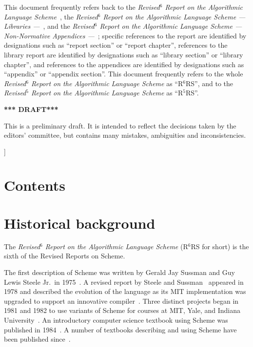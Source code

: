 \documentclass[twoside,twocolumn]{algol60}
\newcommand{\rn}[1]{R$^{#1}$RS}
\begin{document}
{This document frequently refers back to the \textit{Revised$^6$ Report
  on the Algorithmic Language Scheme}~\cite{R6RS}, the
\textit{Revised$^6$ Report on the Algorithmic Language Scheme ---
  Libraries ---}~\cite{R6RS-libraries}, and the \textit{Revised$^6$
  Report on the Algorithmic Language Scheme --- Non-Normative
  Appendices ---}~\cite{R6RS-appendices}; specific references to the
report are identified by designations such as ``report section'' or
``report chapter'', references to the library report are identified by
designations such as ``library section'' or ``library chapter'', and
references to the appendices are identified by designations such as
``appendix'' or ``appendix section''.  This document frequently refers
to the whole \textit{Revised$^6$ Report on the Algorithmic Language
  Scheme} as ``\rn{6}'', and to the \textit{Revised$^5$ Report
  on the Algorithmic Language Scheme} as ``\rn{5}''.

\bigskip

\begin{center}
{\large \bf
*** DRAFT*** \\
}\end{center}

This is a preliminary draft.  It is intended to reflect the decisions
taken by the editors' committee, but contains many mistakes,
ambiguities and inconsistencies.

}]

\texonly\clearpage\endtexonly

\chapter*{Contents}
\addvspace{3.5pt}                  %
\renewcommand{\tocshrink}{-4.0pt}  %
{%
\tableofcontents
}

\vfill

\texonly\clearpage\endtexonly


\chapter{Historical background}

The \textit{Revised$^6$ Report on the Algorithmic Language Scheme}
(\rn{6} for short) is the sixth of the Revised Reports on Scheme.

\vest The first description of Scheme was written by Gerald Jay
Sussman and Guy Lewis Steele Jr.\ in
1975~\cite{Scheme75}.  A revised report by Steele and
Sussman~\cite{Scheme78}
appeared in 1978 and described the evolution
of the language as its MIT implementation was upgraded to support an
innovative compiler~\cite{Rabbit}.  Three distinct projects began in
1981 and 1982 to use variants of Scheme for courses at MIT, Yale, and
Indiana University~\cite{Rees82,MITScheme,Scheme311}.  An introductory
computer science textbook using Scheme was published in
1984~\cite{SICP}.  A number of textbooks describing and using Scheme
have been published since~\cite{tspl3}.
\end{document}
